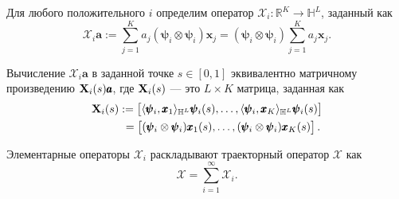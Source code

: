 \documentclass[12pt, specialist, subf
]{disser}
\theoremstyle{definition}
\begin{document}
Для любого положительного $i$ определим оператор $\mathcal{X}_i:\mathbb{R}^K\rightarrow\mathbb{H}^L$, заданный как
\begin{equation}\label{eq: elementary oprator}
	\mathcal{X}_i \pmb{a}:=\sum_{j=1}^K a_j (\pmb{\psi}_i\otimes \pmb{\psi}_i){\pmb x}_j= (\pmb{\psi}_i\otimes \pmb{\psi}_i)\sum_{j=1}^K a_j{\pmb x}_j.
\end{equation}

Вычисление $\mathcal{X}_i \pmb{a}$ в заданной точке $s\in [0,1]$ эквивалентно матричному произведению ${\bf X}_i(s)\pmb{a}$, где ${\bf X}_i(s)$ — это $L \times K$ матрица, заданная как
\begin{align}\label{eq:elementary mat}
	{\bf X}_i(s) & :=
	\begin{bmatrix} \langle\pmb{\psi}_i, {\pmb x}_1\rangle_{\mathbb{H}^L} \pmb{\psi}_i(s), \ldots, \langle\pmb{\psi}_i, {\pmb x}_K\rangle_{\mathbb{H}^L} \pmb{\psi}_i(s) \end{bmatrix}
	\notag            \\ &\ =
	\begin{bmatrix} (\pmb{\psi}_i\otimes \pmb{\psi}_i){\pmb x}_1(s), \ldots, (\pmb{\psi}_i\otimes \pmb{\psi}_i){\pmb x}_K(s) \end{bmatrix}.
\end{align}



Элементарные операторы $\mathcal{X}_i$ раскладывают траекторный оператор $\mathcal{X}$ как
\begin{equation}\label{eq:elementary operators}
	\mathcal{X}=\sum_{i=1}^\infty \mathcal{X}_i.
\end{equation}
\end{document}
